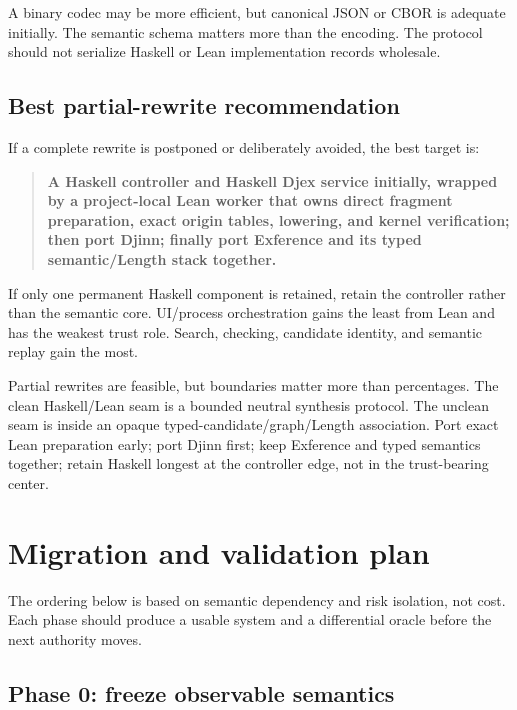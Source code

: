 \documentclass[10pt,letterpaper,oneside]{report}
\begin{document}
A binary codec may be more efficient, but canonical JSON or CBOR is adequate initially. The semantic schema matters more than the encoding. The protocol should not serialize Haskell or Lean implementation records wholesale.

\section{Best partial-rewrite recommendation}

If a complete rewrite is postponed or deliberately avoided, the best target is:

\begin{quote}
\textbf{A Haskell controller and Haskell Djex service initially, wrapped by a project-local Lean worker that owns direct fragment preparation, exact origin tables, lowering, and kernel verification; then port Djinn; finally port Exference and its typed semantic/Length stack together.}
\end{quote}

If only one permanent Haskell component is retained, retain the controller rather than the semantic core. UI/process orchestration gains the least from Lean and has the weakest trust role. Search, checking, candidate identity, and semantic replay gain the most.

\begin{summarybox}
Partial rewrites are feasible, but boundaries matter more than percentages. The clean Haskell/Lean seam is a bounded neutral synthesis protocol. The unclean seam is inside an opaque typed-candidate/graph/Length association. Port exact Lean preparation early; port Djinn first; keep Exference and typed semantics together; retain Haskell longest at the controller edge, not in the trust-bearing center.
\end{summarybox}

\chapter{Migration and validation plan}\label{ch:migration}

The ordering below is based on semantic dependency and risk isolation, not cost. Each phase should produce a usable system and a differential oracle before the next authority moves.

\section{Phase 0: freeze observable semantics}
\end{document}
